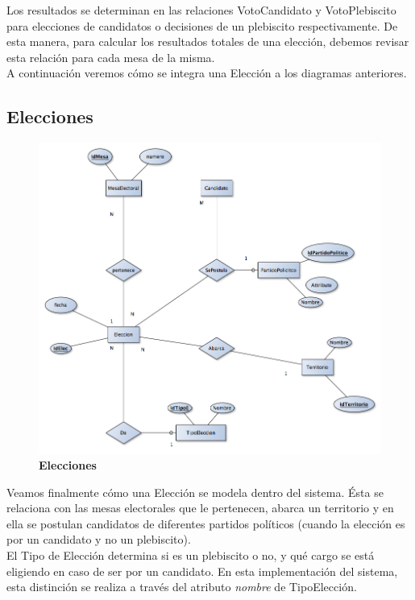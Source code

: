 Los resultados se determinan en las relaciones VotoCandidato y VotoPlebiscito para elecciones de candidatos o decisiones de un plebiscito respectivamente. De esta manera, para calcular los resultados totales de una elección, debemos revisar esta relación para cada mesa de la misma.\\

A continuación veremos cómo se integra una Elección a los diagramas anteriores.\\

\subsection{Elecciones}
\begin{figure}[H]
   \begin{center}
   \includegraphics[scale=0.5]{graphics/der_eleccion.png}
   \caption{\textbf{Elecciones}}
   \label{fig:der}
   \end{center}
\end{figure}

Veamos finalmente cómo una Elección se modela dentro del sistema. Ésta se relaciona con las mesas electorales que le pertenecen, abarca un territorio y en ella se postulan candidatos de diferentes partidos políticos (cuando la elección es por un candidato y no un plebiscito).\\

El Tipo de Elección determina si es un plebiscito o no, y qué cargo se está eligiendo en caso de ser por un candidato. En esta implementación del sistema, esta distinción se realiza a través del atributo \textit{nombre} de TipoElección.\\

